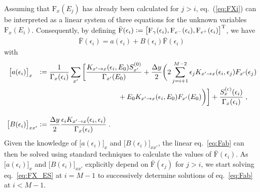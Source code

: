 \documentclass[11pt,a4paper]{article}
\newcommand{\Fpdi}{\mathrm{F}}
\newcommand{\eqsp}{\;}
\newcommand{\X}{x}
\newcommand{\ldefine}{\vcentcolon=}
\begin{document}
Assuming that $\Fpdi_\X(E_j)$ has already been calculated for $j>i$, eq.~(\ref{eq:FXi}) can be interpreted as a linear system of three equations for the unknown variables $\Fpdi_\X(E_i)$. Consequently, by defining $\bar{\Fpdi}(\epsilon_i) \ldefine \big[ \Fpdi_\gamma(\epsilon_i), \Fpdi_{e^-}(\epsilon_i), \Fpdi_{e^+}(\epsilon_i)\big]^\text{T}$, we have
\begin{align}
\bar{\Fpdi}(\epsilon_i) = a(\epsilon_i) + B(\epsilon_i) \bar{\Fpdi}(\epsilon_i)
\label{eq:Fab}
\end{align}
with
\begin{align}
\big[ a(\epsilon_i) \big]_{\X\hphantom{\X'}} & \ldefine \frac{1}{\Gamma_\X(\epsilon_i)} \sum_{\X'} \bigg[ \frac{K_{\X' \to \X} (\epsilon_i, E_0) S_{\X'}^{(0)}}{\Gamma_{\X'} (E_0)} + \frac{\Delta y}{2} \bigg( 2 \sum_{j=i+1}^{M-2} \epsilon_j K_{\X' \to \X} (\epsilon_i, \epsilon_j) F_{\X'}(\epsilon_j)\nonumber\\
& \hspace{4cm} + E_0 K_{\X' \to \X} (\epsilon_i, E_0) F_{\X'}(E_0) \bigg) \bigg] + \frac{S_\X^{\text{(c)}}(\epsilon_i)}{\Gamma_\X(\epsilon_i)}\eqsp, \\[4mm]
\big[B(\epsilon_i)\big]_{\X \X'} & \ldefine \frac{\Delta y}{2} \frac{\epsilon_i K_{\X' \to \X} (\epsilon_i, \epsilon_i)}{\Gamma_\X(\epsilon_i)}\eqsp.
\end{align}
Given the knowledge of $\big[ a(\epsilon_i) \big]_{\X}$ and $\big[B(\epsilon_i)\big]_{\X \X'}$, the linear eq.~\eqref{eq:Fab} can then be solved using standard techniques to calculate the values of $\bar{\Fpdi}(\epsilon_i)$.
As $\big[ a(\epsilon_i) \big]_{\X}$ and $\big[B(\epsilon_i)\big]_{\X \X'}$ explicitly depend on $\bar{\Fpdi}(\epsilon_j)$ for $j > i$, we start solving eq.~\eqref{eq:FX_ES} at $i=M-1$ to successively determine solutions of eq.~\eqref{eq:Fab} at $i < M-1$.
\end{document}
